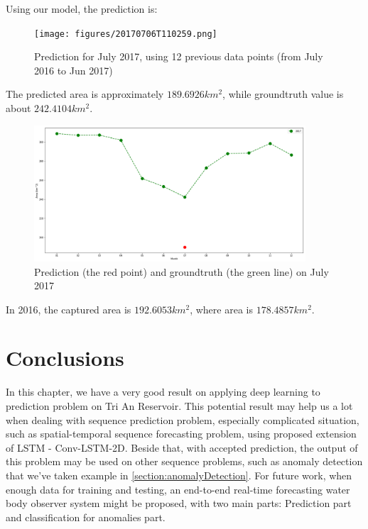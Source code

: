 Using our model, the prediction is:

\begin{figure}[h!]
	\centering
	\texttt{[image: figures/20170706T110259.png]}
	\caption{Prediction for July 2017, using 12 previous data points (from July 2016 to Jun 2017)}
\end{figure}

The predicted area is approximately $189.6926 km^2$, while groundtruth value is about $242.4104 km^2$.


\begin{figure}[h!]
	\centering
	\includegraphics[width=0.9\textwidth]{figures/anomaly.png}
	\caption{Prediction (the red point) and groundtruth (the green line) on July 2017}
\end{figure}

In 2016, the captured area is $192.6053 km^2$, where area is $178.4857 km^2$.

\section{Conclusions}

In this chapter, we have a very good result on applying deep learning to prediction problem on Tri An Reservoir. This potential result may help us a lot when dealing with sequence prediction problem, especially complicated situation, such as spatial-temporal sequence forecasting problem, using proposed extension of LSTM - Conv-LSTM-2D. Beside that, with accepted prediction, the output of this problem may be used on other sequence problems, such as anomaly detection that we've taken example in \ref{section:anomalyDetection}. For future work, when enough data for training and testing, an end-to-end real-time forecasting water body observer system might be proposed, with two main parts: Prediction part and classification for anomalies part. 